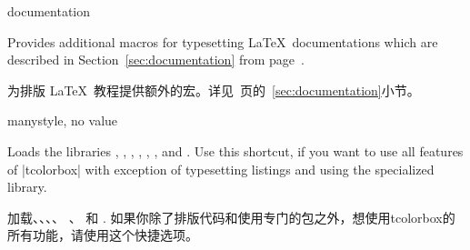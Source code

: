 


\begin{docTcbKey}[library]{documentation}{}{}

Provides additional macros for typesetting \LaTeX\ documentations
which are described in Section~\ref{sec:documentation}
from page~\pageref{sec:documentation}. 

为排版 \LaTeX\ 教程提供额外的宏。详见~\pageref{sec:documentation}页的~\ref{sec:documentation}小节。

\end{docTcbKey}
















\begin{docTcbKey}[library]{many}{}{style, no value}

Loads the libraries , , , ,
, , and .
Use this shortcut, if you want to use all features of |tcolorbox|
with exception of typesetting listings and using
the specialized  library.

加载、、、、%
、 和 .%
如果你除了排版代码和使用专门的包之外，想使用tcolorbox的所有功能，请使用这个快捷选项。

\end{docTcbKey}

